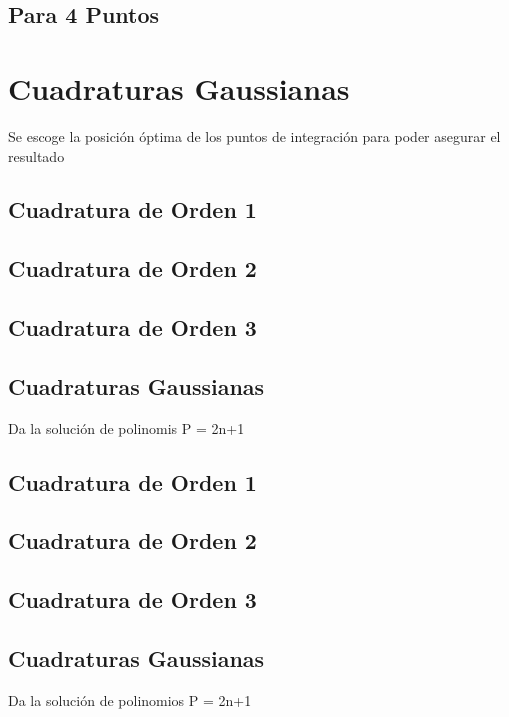 \subsection{Para 4 Puntos}

\section{Cuadraturas Gaussianas}
Se escoge la posici\'on \'optima de los puntos de integraci\'on para poder asegurar el resultado


\subsection{Cuadratura de Orden 1}

\subsection{Cuadratura de Orden 2}

\subsection{Cuadratura de Orden 3}

\subsection{Cuadraturas Gaussianas}
Da la soluci\'on de polinomis P = 2n+1


\subsection{Cuadratura de Orden 1}

\subsection{Cuadratura de Orden 2}

\subsection{Cuadratura de Orden 3}

\subsection{Cuadraturas Gaussianas}
Da la soluci\'on de polinomios P = 2n+1

